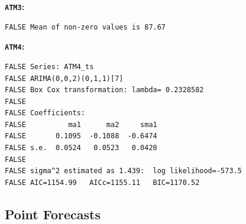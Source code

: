 \documentclass[openany]{book}
\begin{document}
\textbf{\texttt{ATM3}:}

\begin{verbatim}
FALSE Mean of non-zero values is 87.67
\end{verbatim}

\textbf{\texttt{ATM4}:}

\begin{verbatim}
FALSE Series: ATM4_ts 
FALSE ARIMA(0,0,2)(0,1,1)[7] 
FALSE Box Cox transformation: lambda= 0.2328582 
FALSE 
FALSE Coefficients:
FALSE          ma1      ma2     sma1
FALSE       0.1095  -0.1088  -0.6474
FALSE s.e.  0.0524   0.0523   0.0420
FALSE 
FALSE sigma^2 estimated as 1.439:  log likelihood=-573.5
FALSE AIC=1154.99   AICc=1155.11   BIC=1170.52
\end{verbatim}

\hypertarget{Part-A-FC}{%
\subsection*{Point Forecasts}\label{Part-A-FC}}
\end{document}
